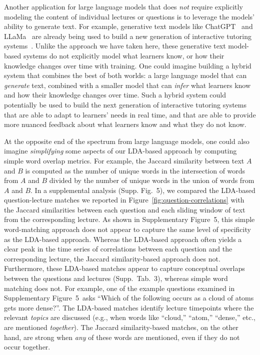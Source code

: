 \documentclass[10pt]{article}
\newcommand{\matchTab}{3}
\newcommand{\jaccard}{5}
\begin{document}
Another application for large language models that does \textit{not} require
explicitly modeling the content of individual lectures or questions is to
leverage the models' ability to generate text. For example, generative text
models like ChatGPT~\citep{ChatGPT} and LLaMa~\citep{TouvEtal23} are already
being used to build a new generation of interactive tutoring
systems~\citep[e.g.,][]{MannEtal23b}. Unlike the approach we have taken here,
these generative text model-based systems do not explicitly model what learners
know, or how their knowledge changes over time with training. One could imagine
building a hybrid system that combines the best of both worlds: a large
language model that can \textit{generate} text, combined with a smaller model
that can \textit{infer} what learners know and how their knowledge changes over
time. Such a hybrid system could potentially be used to build the next
generation of interactive tutoring systems that are able to adapt to learners'
needs in real time, and that are able to provide more nuanced feedback about
what learners know and what they do not know.

At the opposite end of the spectrum from large language models, one could also
imagine \textit{simplifying} some aspects of our LDA-based approach by
computing simple word overlap metrics. For example, the Jaccard similarity
between text $A$ and $B$ is computed as the number of unique words in the
intersection of words from $A$ and $B$ divided by the number of unique words in
the union of words from $A$ and $B$. In a supplemental analysis (Supp.
Fig.~\jaccard), we compared the LDA-based question-lecture matches we reported
in Figure~\ref{fig:question-correlations} with the Jaccard similarities between
each question and each sliding window of text from the corresponding lecture.
As shown in Supplementary Figure~\jaccard, this simple word-matching approach
does not appear to capture the same level of specificity as the LDA-based
approach. Whereas the LDA-based approach often yields a clear peak in the
time series of correlations between each question and the corresponding lecture,
the Jaccard similarity-based approach does not. Furthermore, these LDA-based
matches appear to capture conceptual overlaps between the questions and
lectures (Supp.~Tab.~\matchTab), whereas simple word matching does not. For
example, one of the example questions examined in Supplementary
Figure~\jaccard~asks ``Which of the following occurs as a cloud of atoms gets
more dense?''. The LDA-based matches identify lecture timepoints where the
relevant \textit{topics} are discussed (e.g., when words like ``cloud,''
``atom,'' ``dense,'' etc., are mentioned \textit{together}). The Jaccard
similarity-based matches, on the other hand, are strong when \textit{any} of
these words are mentioned, even if they do not occur together.
\end{document}
